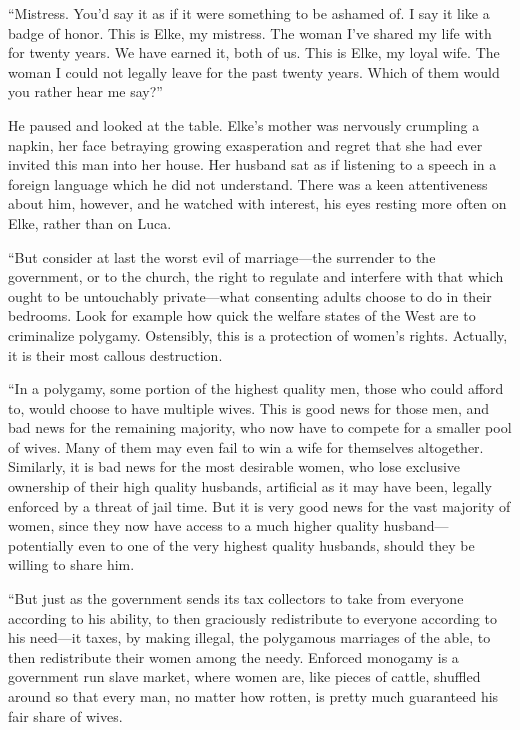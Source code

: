 ``Mistress. You'd say it as if it were something to be ashamed of. I say it like a badge of honor. This is Elke, my mistress. The woman I've shared my life with for twenty years. We have earned it, both of us. This is Elke, my loyal wife. The woman I could not legally leave for the past twenty years. Which of them would you rather hear me say?''

He paused and looked at the table. Elke's mother was nervously crumpling a napkin, her face betraying growing exasperation and regret that she had ever invited this man into her house. Her husband sat as if listening to a speech in a foreign language which he did not understand. There was a keen attentiveness about him, however, and he watched with interest, his eyes resting more often on Elke, rather than on Luca.

``But consider at last the worst evil of marriage---the surrender to the government, or to the church, the right to regulate and interfere with that which ought to be untouchably private---what consenting adults choose to do in their bedrooms. Look for example how quick the welfare states of the West are to criminalize polygamy. Ostensibly, this is a protection of women's rights. Actually, it is their most callous destruction.

``In a polygamy, some portion of the highest quality men, those who could afford to, would choose to have multiple wives. This is good news for those men, and bad news for the remaining majority, who now have to compete for a smaller pool of wives. Many of them may even fail to win a wife for themselves altogether. Similarly, it is bad news for the most desirable women, who lose exclusive ownership of their high quality husbands, artificial as it may have been, legally enforced by a threat of jail time. But it is very good news for the vast majority of women, since they now have access to a much higher quality husband---potentially even to one of the very highest quality husbands, should they be willing to share him.

``But just as the government sends its tax collectors to take from everyone according to his ability, to then graciously redistribute to everyone according to his need---it taxes, by making illegal, the polygamous marriages of the able, to then redistribute their women among the needy. Enforced monogamy is a government run slave market, where women are, like pieces of cattle, shuffled around so that every man, no matter how rotten, is pretty much guaranteed his fair share of wives.

